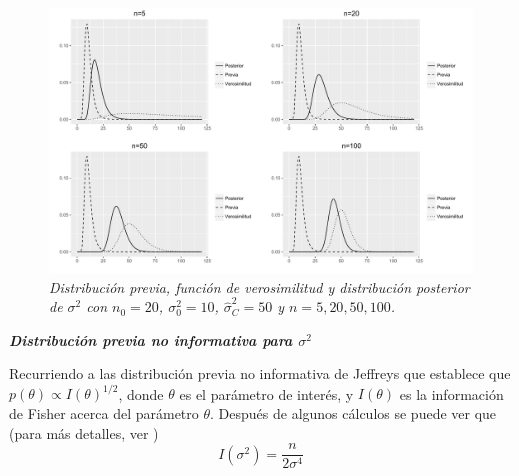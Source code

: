     \begin{figure}[!h]
    \centering
    \includegraphics[scale=0.5]{Sigma2_compara.pdf}
    \caption{\emph{Distribuci\'on previa, funci\'on de verosimilitud y distribuci\'on posterior de $\sigma^2$ con $n_0=20$, $\sigma^2_0=10$, $\hat{\sigma}^2_C=50$ y $n=5,20,50,100$.}}
    \label{Posterior_Sigma2}
    \end{figure}
    
    \textbf{\emph{Distribuci\'on previa no informativa para $\sigma^2$}}
    
    Recurriendo a las distribuci\'on previa no informativa de Jeffreys que establece que $p(\theta)\propto I(\theta) ^{1/2}$, donde $\theta$ es el par\'ametro de inter\'es, y $I(\theta)$ es la informaci\'on de Fisher acerca del par\'ametro $\theta$. Despu\'es de algunos c\'alculos se puede ver que (para m\'as detalles, ver )
    \begin{equation*}
    I(\sigma^2)=\dfrac{n}{2\sigma^4}
    \end{equation*}
    
